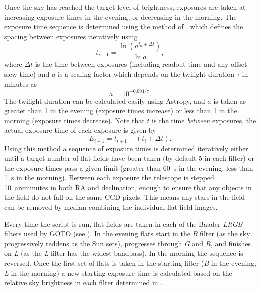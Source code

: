 \begin{colsection}
Once the sky has reached the target level of brightness, exposures are taken at increasing exposure times in the evening, or decreasing in the morning. The exposure time sequence is determined using the method of \citet{flats3}, which defines the spacing between exposures iteratively using
%
\begin{equation}
    t_{i+1} = \frac{\ln{(a^{t_n+\Delta t})}}{\ln{a}},
    \label{eq:sky}
\end{equation}
%
where $\Delta t$ is the time between exposures (including readout time and any offset slew time) and $a$ is a scaling factor which depends on the twilight duration $\tau$ in minutes as
%
\begin{equation}
    a = 10^{\pm 0.094/\tau}.
    \label{eq:sky2}
\end{equation}
%
The twilight duration can be calculated easily using Astropy, and $a$ is taken as greater than 1 in the evening (exposure times increase) or less than 1 in the morning (exposure times decrease). Note that $t$ is the time \emph{between} exposures, the actual exposure time of each exposure is given by
%
\begin{equation}
    E_{i+1} = t_{i+1} - (t_i + \Delta t).
    \label{eq:sky3}
\end{equation}
%
Using this method a sequence of exposure times is determined iteratively either until a target number of flat fields have been taken (by default 5 in each filter) or the exposure times pass a given limit (greater than \SI{60}{\second} in the evening, less than \SI{1}{\second} in the morning). Between each exposure the telescope is stepped 10~arcminutes in both RA and declination, enough to ensure that any objects in the field do not fall on the same CCD pixels. This means any stars in the field can be removed by median combining the individual flat field images.

Every time the script is run, flat fields are taken in each of the Baader \textit{LRGB} filters used by GOTO (see ). In the evening flats start in the \textit{B} filter (as the sky progressively reddens as the Sun sets), progresses through \textit{G} and \textit{R}, and finishes on \textit{L} (as the \textit{L} filter has the widest bandpass). In the morning the sequence is reversed. Once the first set of flats is taken in the starting filter (\textit{B} in the evening, \textit{L} in the morning) a new starting exposure time is calculated based on the relative sky brightness in each filter determined in .


\end{colsection}
